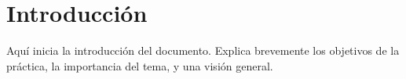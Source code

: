 
\section{Introducción}
Aquí inicia la introducción del documento. Explica brevemente los objetivos de la práctica, la importancia del tema, y una visión general.